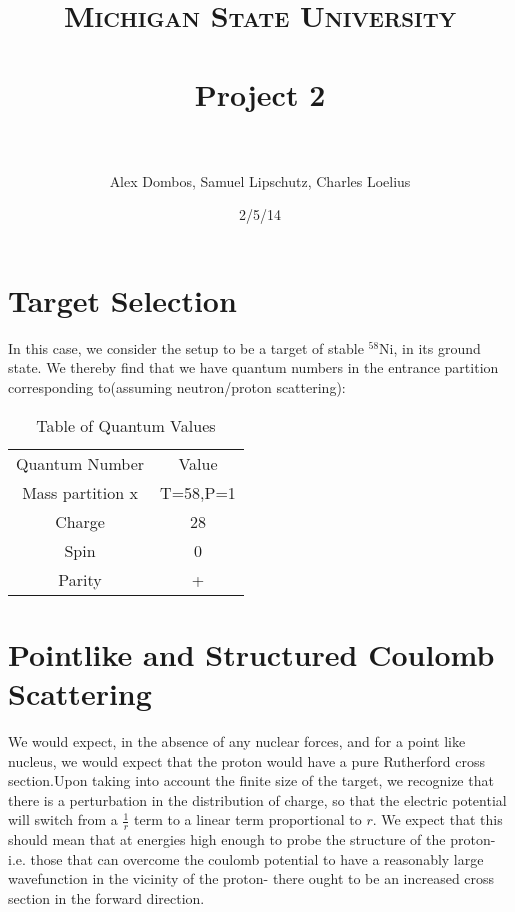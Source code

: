 \documentclass[paper=a4, fontsize=11pt]{scrartcl} %
\title{	
\normalfont \normalsize 
\textsc{Michigan State University} \\ [25pt] %
\horrule{0.5pt} \\[0.4cm] %
\huge  Project 2 \\ %
\horrule{2pt} \\[0.5cm] %
}
\author{Alex Dombos, Samuel Lipschutz, Charles Loelius} %
\date{\normalsize 2/5/14} %
\numberwithin{equation}{section} %
\numberwithin{figure}{section} %
\numberwithin{table}{section} %
\begin{document}
\maketitle %


\section{Target Selection}

In this case, we consider the setup to be a target of stable $^{58}$Ni, in its ground state. We thereby find that we have quantum numbers in the entrance partition corresponding to(assuming neutron/proton scattering):\\
\begin{center}
\begin{table}[h!]
\captionsetup{font=large}
\caption{Table of Quantum Values}
\centering
\vspace{3 mm}
\begin{tabular}{|c|c|}

Quantum Number & Value \\
Mass partition x & T=58,P=1\\
Charge & 28 \\
Spin & 0\\
Parity & +


\end{tabular}
\end{table}
\end{center}


\section{Pointlike and Structured Coulomb Scattering}

We would expect, in the absence of any nuclear forces, and for a point like nucleus, we would expect that the proton would have a pure Rutherford cross section.Upon taking into account the finite size of the target, we recognize that there is a perturbation in the distribution of charge, so that the electric potential will switch from a $\frac{1}{r}$ term to a linear term proportional to $r$. We expect that this should mean that at energies high enough to probe the structure of the proton-i.e. those that can overcome the coulomb potential to have a reasonably large wavefunction in the vicinity of the proton- there ought to be an increased cross section in the forward direction. \\
\end{document}
